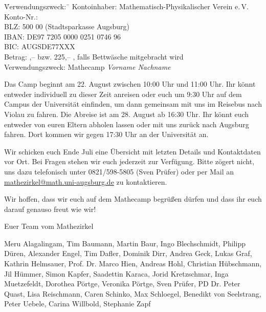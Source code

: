 \documentclass[12pt]{zettel}
\begin{document}
\vspace{-0.7em}
\begin{tabbing}
  \qquad\quad \= Verwendungszweck:\, \= \kill
  \> Kontoinhaber: \> Mathematisch-Physikalischer Verein e.\,V. \\
  \> Konto-Nr.:  \\
  \> BLZ:  500 00 (Stadtsparkasse Augsburg) \\
  \> IBAN: \> DE97 7205 0000 0251 0746 96 \\
  \> BIC: \> AUGSDE77XXX \\
  \> Betrag: ,-- \texteuro{} bzw. 225,-- \texteuro, falls Bettwäsche
  mitgebracht wird \\
  \> Verwendungszweck: \> Mathecamp \emph{Vorname Nachname}
\end{tabbing}
\vspace{-0.7em}

Das Camp beginnt am 22. August zwischen 10:00 Uhr und 11:00 Uhr. Ihr könnt
entweder individuell zu dieser Zeit anreisen oder euch um 9:30 Uhr auf dem Campus der
Universität einfinden, um dann gemeinsam mit uns im Reisebus nach Violau zu fahren.
Die Abreise ist am 28. August ab 16:30 Uhr. Ihr könnt euch entweder von euren
Eltern abholen lassen oder mit uns zurück nach Augsburg fahren. Dort kommen wir
gegen 17:30 Uhr an der Universität an.

Wir schicken euch Ende Juli eine Übersicht mit
letzten Details und Kontaktdaten vor Ort. Bei Fragen stehen wir euch jederzeit
zur Verfügung. Bitte zögert nicht, uns dazu telefonisch unter 0821/598-5805
(Sven Prüfer) oder per Mail an
\href{mailto:mathezirkel@math.uni-augsburg.de}{\textsf{mathezirkel@math.uni-augsburg.de}} zu kontaktieren.

Wir hoffen, dass wir
euch auf dem Mathecamp begrüßen dürfen und dass
ihr euch darauf genauso freut wie wir!

\vspace{2em}

Euer Team vom Mathezirkel

{\small Meru Alagalingam, Tim Baumann, Martin Baur, Ingo Blechschmidt, Philipp
Düren, Alexander Engel, Tim Dafler, Dominik Dirr, Andrea Geck, Lukas Graf,
Kathrin Helmsauer, Prof. Dr. Marco Hien, Andreas Hohl, Christian Hübschmann,
Jil Hümmer, Simon Kapfer, Saadettin Karaca, Jorid Kretzschmar, Inga
Muetzefeldt, Dorothea Pörtge, Veronika Pörtge, Sven Prüfer, PD Dr. Peter Quast,
Lisa Reischmann, Caren Schinko, Max Schloegel, Benedikt von Seelstrang, Peter
Uebele, Carina Willbold, Stephanie Zapf}
\end{document}
